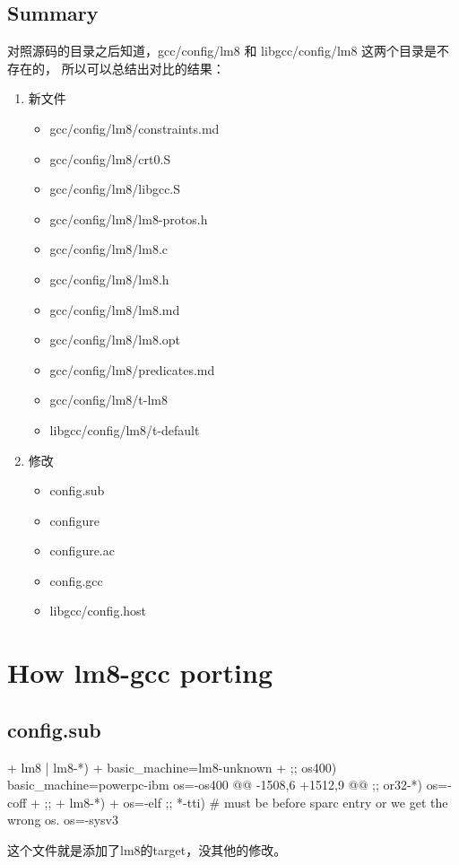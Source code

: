 \section{Summary}
对照源码的目录之后知道，gcc/config/lm8 和 libgcc/config/lm8 这两个目录是不存在的，
所以可以总结出对比的结果：
\begin{enumerate}
    \item 新文件
    \begin{itemize}
        \item gcc/config/lm8/constraints.md
        \item gcc/config/lm8/crt0.S
        \item gcc/config/lm8/libgcc.S
        \item gcc/config/lm8/lm8-protos.h
        \item gcc/config/lm8/lm8.c
        \item gcc/config/lm8/lm8.h
        \item gcc/config/lm8/lm8.md
        \item gcc/config/lm8/lm8.opt
        \item gcc/config/lm8/predicates.md
        \item gcc/config/lm8/t-lm8
        \item libgcc/config/lm8/t-default
    \end{itemize}

    \item 修改
    \begin{itemize}
        \item config.sub
        \item configure
        \item configure.ac
        \item config.gcc
        \item libgcc/config.host
    \end{itemize}
\end{enumerate}

\chapter{How lm8-gcc porting}
\section{config.sub}

\begin{diffcode}
+	lm8 | lm8-*)
+		basic_machine=lm8-unknown
+		;;
 	os400)
 		basic_machine=powerpc-ibm
 		os=-os400
@@ -1508,6 +1512,9 @@
 		;;
 	or32-*)
 		os=-coff
+		;;
+	lm8-*)
+		os=-elf
 		;;
 	*-tti)	# must be before sparc entry or we get the wrong os.
 		os=-sysv3

\end{diffcode}

这个文件就是添加了lm8的target，没其他的修改。

